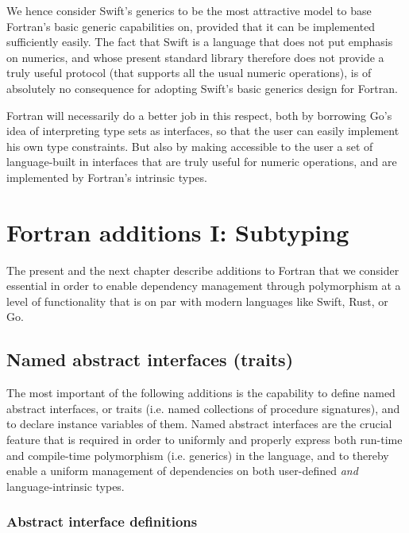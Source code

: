 \documentclass[11pt,oneside]{report}
\newcommand{\code}[1]{{\selectfont\ttfamily{#1}}}
\begin{document}
We hence consider Swift's generics to be the most attractive model to
base Fortran's basic generic capabilities on, provided that it can be
implemented sufficiently easily. The fact that Swift is a language
that does not put emphasis on numerics, and whose present standard
library therefore does not provide a truly useful \code{Numeric}
protocol (that supports all the usual numeric operations), is of
absolutely no consequence for adopting Swift's basic generics design
for Fortran.

Fortran will necessarily do a better job in this respect, both by
borrowing Go's idea of interpreting type sets as interfaces, so that
the user can easily implement his own type constraints. But also by
making accessible to the user a set of language-built in interfaces
that are truly useful for numeric operations, and are implemented by
Fortran's intrinsic types.


\chapter{Fortran additions I: Subtyping}

The present and the next chapter describe additions to Fortran that we
consider essential in order to enable dependency management through
polymorphism at a level of functionality that is on par with modern
languages like Swift, Rust, or Go.

\section{Named abstract interfaces (traits)}

The most important of the following additions is the capability to
define named abstract interfaces, or traits (i.e. named collections of
procedure signatures), and to declare instance variables of
them. Named abstract interfaces are the crucial feature that is
required in order to uniformly and properly express both run-time and
compile-time polymorphism (i.e. generics) in the language, and to
thereby enable a uniform management of dependencies on both
user-defined \emph{and} language-intrinsic types.

\subsection{Abstract interface definitions}
\label{sect:interface_defs}
\end{document}

